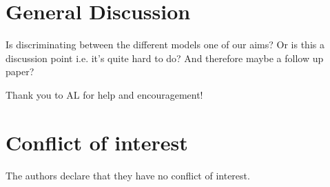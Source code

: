 \documentclass[smallextended, natbib]{svjour3}       %
\begin{document}
\section{General Discussion}

Is discriminating between the different models one of our aims? Or is this a discussion point i.e. it's quite hard to do? And therefore maybe a follow up paper?


\begin{acknowledgements}
Thank you to AL for help and encouragement! 
\end{acknowledgements}

%
\section*{Conflict of interest}
The authors declare that they have no conflict of interest.

\end{document}
